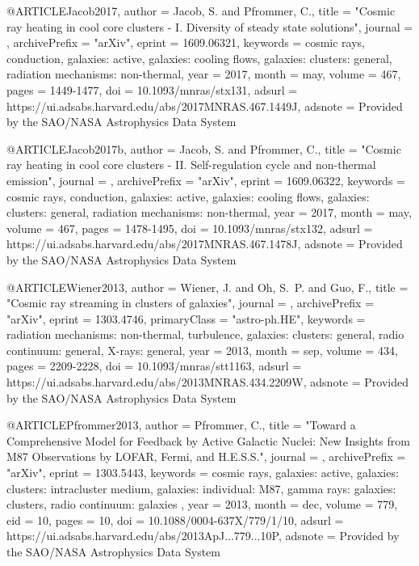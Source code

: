 \documentclass[useAMS,usenatbib]{mnras}
\begin{document}
{{{{{{@ARTICLE{Jacob2017,
   author = {{Jacob}, S. and {Pfrommer}, C.},
    title = "{Cosmic ray heating in cool core clusters - I. Diversity of steady state solutions}",
  journal = {\mnras},
archivePrefix = "arXiv",
   eprint = {1609.06321},
 keywords = {cosmic rays, conduction, galaxies: active, galaxies: cooling flows, galaxies: clusters: general, radiation mechanisms: non-thermal},
     year = 2017,
    month = may,
   volume = 467,
    pages = {1449-1477},
      doi = {10.1093/mnras/stx131},
   adsurl = {https://ui.adsabs.harvard.edu/abs/2017MNRAS.467.1449J},
  adsnote = {Provided by the SAO/NASA Astrophysics Data System}
}

@ARTICLE{Jacob2017b,
   author = {{Jacob}, S. and {Pfrommer}, C.},
    title = "{Cosmic ray heating in cool core clusters - II. Self-regulation cycle and non-thermal emission}",
  journal = {\mnras},
archivePrefix = "arXiv",
   eprint = {1609.06322},
 keywords = {cosmic rays, conduction, galaxies: active, galaxies: cooling flows, galaxies: clusters: general, radiation mechanisms: non-thermal},
     year = 2017,
    month = may,
   volume = 467,
    pages = {1478-1495},
      doi = {10.1093/mnras/stx132},
   adsurl = {https://ui.adsabs.harvard.edu/abs/2017MNRAS.467.1478J},
  adsnote = {Provided by the SAO/NASA Astrophysics Data System}
}

@ARTICLE{Wiener2013,
   author = {{Wiener}, J. and {Oh}, S.~P. and {Guo}, F.},
    title = "{Cosmic ray streaming in clusters of galaxies}",
  journal = {\mnras},
archivePrefix = "arXiv",
   eprint = {1303.4746},
 primaryClass = "astro-ph.HE",
 keywords = {radiation mechanisms: non-thermal, turbulence, galaxies: clusters: general, radio continuum: general, X-rays: general},
     year = 2013,
    month = sep,
   volume = 434,
    pages = {2209-2228},
      doi = {10.1093/mnras/stt1163},
   adsurl = {https://ui.adsabs.harvard.edu/abs/2013MNRAS.434.2209W},
  adsnote = {Provided by the SAO/NASA Astrophysics Data System}
}

@ARTICLE{Pfrommer2013,
   author = {{Pfrommer}, C.},
    title = "{Toward a Comprehensive Model for Feedback by Active Galactic Nuclei: New Insights from M87 Observations by LOFAR, Fermi, and H.E.S.S.}",
  journal = {\apj},
archivePrefix = "arXiv",
   eprint = {1303.5443},
 keywords = {cosmic rays, galaxies: active, galaxies: clusters: intracluster medium, galaxies: individual: M87, gamma rays: galaxies: clusters, radio continuum: galaxies },
     year = 2013,
    month = dec,
   volume = 779,
      eid = {10},
    pages = {10},
      doi = {10.1088/0004-637X/779/1/10},
   adsurl = {https://ui.adsabs.harvard.edu/abs/2013ApJ...779...10P},
  adsnote = {Provided by the SAO/NASA Astrophysics Data System}
}

}}}}}}
\end{document}
